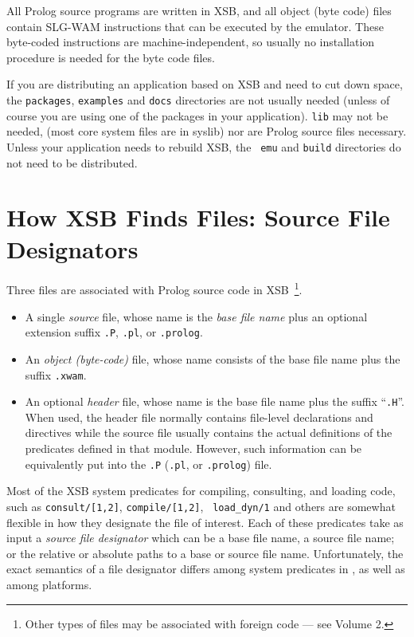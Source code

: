 \noindent
All Prolog source programs are written in XSB, and all object (byte
code) files contain SLG-WAM instructions that can be executed by the
emulator.  These byte-coded instructions are machine-independent, so
usually no installation procedure is needed for the byte code files.

If you are distributing an application based on XSB and need to cut
down space, the {\tt packages}, {\tt examples} and {\tt docs}
directories are not usually needed (unless of course you are using one
of the packages in your application).  {\tt lib} may not be needed,
(most core system files are in syslib) nor are Prolog source files
necessary.  Unless your application needs to rebuild XSB, the {\tt
  emu} and {\tt build} directories do not need to be distributed.

\section{How XSB Finds Files: Source File Designators}  \label{sec:filenames}
%
Three files are associated with Prolog source code in
XSB~\footnote{Other types of files may be associated with foreign code
--- see Volume 2.}.
\begin{itemize}
\item A single {\it source} file, whose name is the {\em base file
  name} plus an optional extension suffix {\tt .P}, {\tt .pl}, or {\tt .prolog}.
\item An {\it object (byte-code)} file, whose name consists of the
  base file name plus the suffix {\tt .xwam}.
\item An optional {\it header} file, whose name is the base file name
  plus the suffix ``{\tt .H}''.  When used, the header file normally
  contains file-level declarations and directives while the source
  file usually contains the actual definitions of the predicates
  defined in that module.  However, such information can be
  equivalently put into the {\tt .P} ({\tt .pl}, or {\tt .prolog}) file.
\end{itemize}
%
Most of the XSB system predicates for compiling, consulting, and
loading code, such as {\tt consult/[1,2]}, {\tt compile/[1,2]}, {\tt
  load\_dyn/1} and others are somewhat flexible in how they designate
the file of interest.  Each of these predicates take as input a {\em
  source file designator} which can be a base file name, a source file
name; or the relative or absolute paths to a base or source file name.
Unfortunately, the exact semantics of a file designator differs among
system predicates in \version, as well as among platforms.

